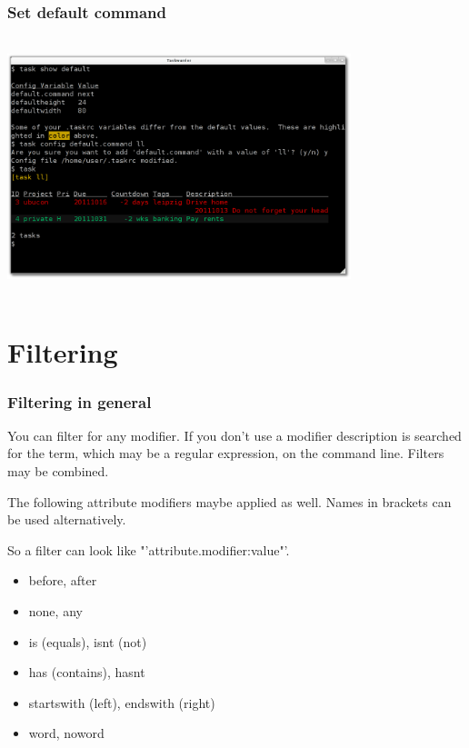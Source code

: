\documentclass[t,handout]{beamer}
\begin{document}
\begin{frame}
\frametitle{Set default command}
\begin{center}
\includegraphics[width=10cm,height=7.5cm]{set_default_command.png}
\end{center}
\end{frame}

\section{Filtering}

\begin{frame}
\frametitle{Filtering in general}

You can filter for any modifier. If you don't use a modifier description is searched for the term, which may be a regular expression, on the command line. Filters may be combined.

The following attribute modifiers maybe applied as well. Names in brackets can be used alternatively.

So a filter can look like "'attribute.modifier:value"'.

\begin{itemize}
\item before, after
\item none, any
\item is (equals), isnt (not)
\item has (contains), hasnt
\item startswith (left), endswith (right)
\item word, noword
\end{itemize}
\end{frame}
\end{document}
